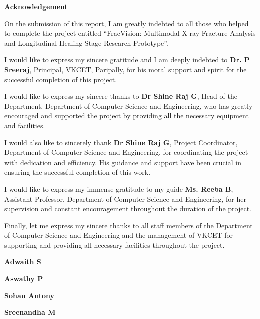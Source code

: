 \documentclass[12pt,a4paper]{article}
\begin{document}
\setcounter{page}{1}
\thispagestyle{empty}
\begin{flushleft}
  {\fontsize{16pt}{20pt}\selectfont\bfseries Acknowledgement\par}
\end{flushleft}
\vspace{18pt}
{\fontsize{11.3pt}{18.5pt}\selectfont
On the submission of this report, I am greatly indebted to all those who helped to complete the project entitled ``FracVision: Multimodal X-ray Fracture Analysis and Longitudinal Healing-Stage Research Prototype''.

I would like to express my sincere gratitude and I am deeply indebted to \textbf{Dr. P Sreeraj}, Principal, VKCET, Paripally, for his moral support and spirit for the successful completion of this project.

I would like to express my sincere thanks to \textbf{Dr Shine Raj G}, Head of the Department, Department of Computer Science and Engineering, who has greatly encouraged and supported the project by providing all the necessary equipment and facilities.

I would also like to sincerely thank \textbf{Dr Shine Raj G}, Project Coordinator, Department of Computer Science and Engineering, for coordinating the project with dedication and efficiency. His guidance and support have been crucial in ensuring the successful completion of this work.

I would like to express my immense gratitude to my guide \textbf{Ms. Reeba B}, Assistant Professor, Department of Computer Science and Engineering, for her supervision and constant encouragement throughout the duration of the project.

Finally, let me express my sincere thanks to all staff members of the Department of Computer Science and Engineering and the management of VKCET for supporting and providing all necessary facilities throughout the project.
\par\vspace{18pt}
\begin{flushright}
  {\bfseries Adwaith S\par}
  {\bfseries Aswathy P\par}
  {\bfseries Sohan Antony\par}
  {\bfseries Sreenandha M\par}
\end{flushright}
}
\restoregeometry
\newpage
\end{document}
